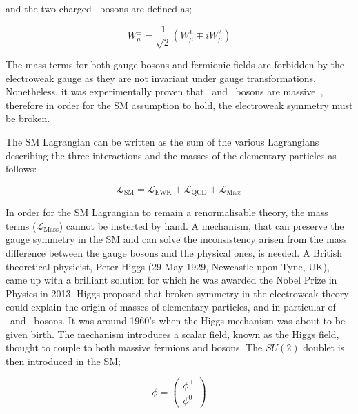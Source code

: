 			\noindent and the two charged \Wboson\ bosons are defined as;

			\begin{equation}
			\label{eq:Wboson}
				W_{\mu}^\pm = \frac{1}{\sqrt{2}} \displaystyle \left ( W_{\mu}^1 \mp i W_{\mu}^2 \right )
			\end{equation}

			The mass terms for both gauge bosons and fermionic fields are forbidden by the electroweak gauge as they are not invariant under gauge transformations. Nonetheless, it was experimentally proven that \Wboson\ and \Zboson\ bosons are massive~\cite{Pich2012}, therefore in order for the SM assumption to hold, the electroweak symmetry must be broken. 

			The SM Lagrangian can be written as the sum of the various Lagrangians describing the three interactions and the masses of the elementary particles as follows:

			\begin{equation}
			\label{eq:SM_Lagrangian}
				\mathcal{L_{\mathrm{SM}}} = \mathcal{L_{\mathrm{EWK}}} + \mathcal{L_{\mathrm{QCD}}} + \mathcal{L_{\mathrm{Mass}}}
			\end{equation}

			\noindent In order for the SM Lagrangian to remain a renormalisable theory, the mass terms ($\mathcal{L_{\mathrm{Mass}}}$) cannot be insterted by hand. A mechanism, that can preserve the gauge symmetry in the SM and can solve the inconsistency arisen from the mass difference between the gauge bosons and the physical ones, is needed. A British theoretical physicist, Peter Higgs (29 May 1929, Newcastle upon Tyne, UK), came up with a brilliant solution for which he was awarded the Nobel Prize in Physics in 2013. Higgs proposed that broken symmetry in the electroweak theory could explain the origin of masses of elementary particles, and in particular of \Wboson\ and \Zboson\ bosons. It was around 1960's when the Higgs mechanism was about to be given birth. %
			The mechanism introduces a scalar field, known as the Higgs field, thought to couple to both massive fermions and bosons. The $SU(2)$ doublet is then introduced in the SM;

			\begin{equation}
			\label{eq:Higgs_field}
				\phi = 
				\begin{pmatrix}
					\phi^+ \\ \phi^0
				\end{pmatrix} 
			\end{equation}

